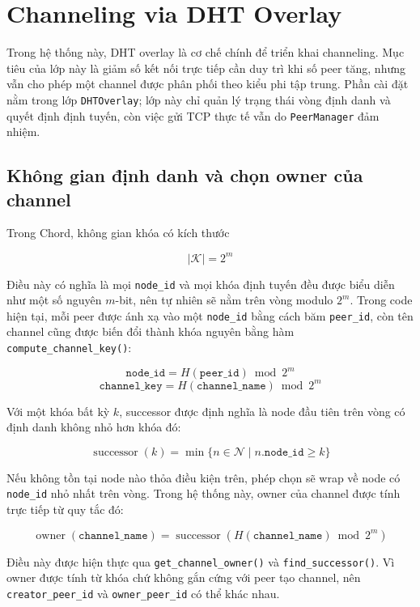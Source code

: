 \section{Channeling via DHT Overlay}
Trong hệ thống này, DHT overlay là cơ chế chính để triển khai channeling. Mục tiêu của lớp này là giảm số kết nối trực tiếp cần duy trì khi số peer tăng, nhưng vẫn cho phép một channel được phân phối theo kiểu phi tập trung. Phần cài đặt nằm trong lớp \texttt{DHTOverlay}; lớp này chỉ quản lý trạng thái vòng định danh và quyết định định tuyến, còn việc gửi TCP thực tế vẫn do \texttt{PeerManager} đảm nhiệm.

\subsection{Không gian định danh và chọn owner của channel}
Trong Chord, không gian khóa có kích thước
\begin{center}
\[
\lvert \mathcal{K} \rvert = 2^m
\]
\end{center}

Điều này có nghĩa là mọi \texttt{node\_id} và mọi khóa định tuyến đều được biểu diễn như một số nguyên $m$-bit, nên tự nhiên sẽ nằm trên vòng modulo $2^m$. Trong code hiện tại, mỗi peer được ánh xạ vào một \texttt{node\_id} bằng cách băm \texttt{peer\_id}, còn tên channel cũng được biến đổi thành khóa nguyên bằng hàm \texttt{compute\_channel\_key()}:
\begin{center}
\[
\texttt{node\_id} = H(\texttt{peer\_id}) \bmod 2^m
\]
\[
\texttt{channel\_key} = H(\texttt{channel\_name}) \bmod 2^m
\]
\end{center}

Với một khóa bất kỳ $k$, successor được định nghĩa là node đầu tiên trên vòng có định danh không nhỏ hơn khóa đó:
\begin{center}
\[
\operatorname{successor}(k)
= \min \{ n \in \mathcal{N} \mid n.\texttt{node\_id} \ge k \}
\]
\end{center}

Nếu không tồn tại node nào thỏa điều kiện trên, phép chọn sẽ wrap về node có \texttt{node\_id} nhỏ nhất trên vòng. Trong hệ thống này, owner của channel được tính trực tiếp từ quy tắc đó:
\begin{center}
\[
\operatorname{owner}(\texttt{channel\_name})
= \operatorname{successor}(H(\texttt{channel\_name}) \bmod 2^m)
\]
\end{center}

Điều này được hiện thực qua \texttt{get\_channel\_owner()} và \texttt{find\_successor()}. Vì owner được tính từ khóa chứ không gắn cứng với peer tạo channel, nên \texttt{creator\_peer\_id} và \texttt{owner\_peer\_id} có thể khác nhau.

